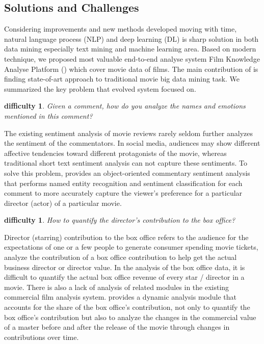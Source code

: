 \subsection{Solutions and Challenges}
Considering improvements and new methods developed moving with time, natural language process (NLP) and deep learning (DL) is sharp solution in both data mining especially text mining and machine learning area. Based on modern technique, we proposed most valuable end-to-end analyse system Film Knowledge Analyse Platform (\system) which cover movie data of films. The main contribution of \system is finding state-of-art approach to traditional movie big data mining task. We summarized the key problem that evolved system \system focused on.
\newtheorem{difficulties}[theorem]{difficulty}
\begin{difficulties}
Given a comment, how do you analyze the names and emotions mentioned in this comment? \end{difficulties}
\par The existing sentiment analysis of movie reviews rarely seldom further analyzes the sentiment of the commentators. In social media, audiences may show different affective tendencies toward different protagonists of the movie, whereas traditional short text sentiment analysis can not capture these sentiments. To solve this problem, \system provides an object-oriented commentary sentiment analysis that performs named entity recognition and sentiment classification for each comment to more accurately capture the viewer's preference for a particular director (actor) of a particular movie.
\begin{difficulties}
How to quantify the director's contribution to the box office?
\end{difficulties}
\par Director (starring) contribution to the box office refers to the audience for the expectations of one or a few people to generate consumer spending movie tickets, analyze the contribution of a box office contribution to help get the actual business director or director value. In the analysis of the box office data, it is difficult to quantify the actual box office revenue of every star / director in a movie. There is also a lack of analysis of related modules in the existing commercial film analysis system.
\system provides a dynamic analysis module that accounts for the share of the box office's contribution, not only to quantify the box office's contribution but also to analyze the changes in the commercial value of a master before and after the release of the movie through changes in contributions over time.
